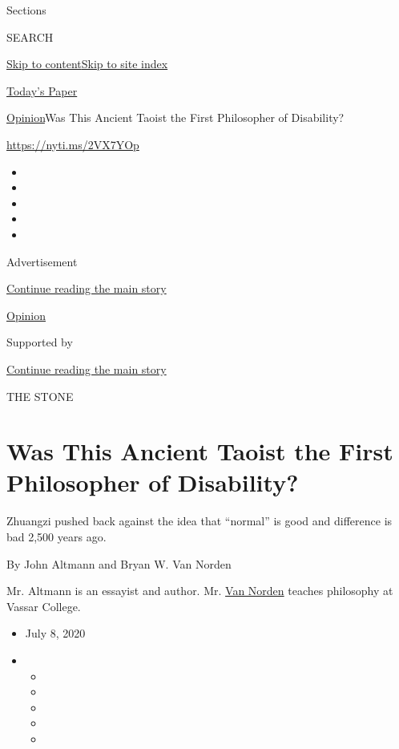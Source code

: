 Sections

SEARCH

\protect\hyperlink{site-content}{Skip to
content}\protect\hyperlink{site-index}{Skip to site index}

\href{https://myaccount.nytimes.com/auth/login?response_type=cookie\&client_id=vi}{}

\href{https://www.nytimes.com/section/todayspaper}{Today's Paper}

\href{/section/opinion}{Opinion}\textbar{}Was This Ancient Taoist the
First Philosopher of Disability?

\href{https://nyti.ms/2VX7YOp}{https://nyti.ms/2VX7YOp}

\begin{itemize}
\item
\item
\item
\item
\item
\end{itemize}

Advertisement

\protect\hyperlink{after-top}{Continue reading the main story}

\href{/section/opinion}{Opinion}

Supported by

\protect\hyperlink{after-sponsor}{Continue reading the main story}

THE STONE

\hypertarget{was-this-ancient-taoist-the-first-philosopher-of-disability}{%
\section{Was This Ancient Taoist the First Philosopher of
Disability?}\label{was-this-ancient-taoist-the-first-philosopher-of-disability}}

Zhuangzi pushed back against the idea that ``normal'' is good and
difference is bad 2,500 years ago.

By John Altmann and Bryan W. Van Norden

Mr. Altmann is an essayist and author. Mr.
\href{http://www.bryanvannorden.com/}{Van Norden} teaches philosophy at
Vassar College.

\begin{itemize}
\item
  July 8, 2020
\item
  \begin{itemize}
  \item
  \item
  \item
  \item
  \item
  \end{itemize}
\end{itemize}

